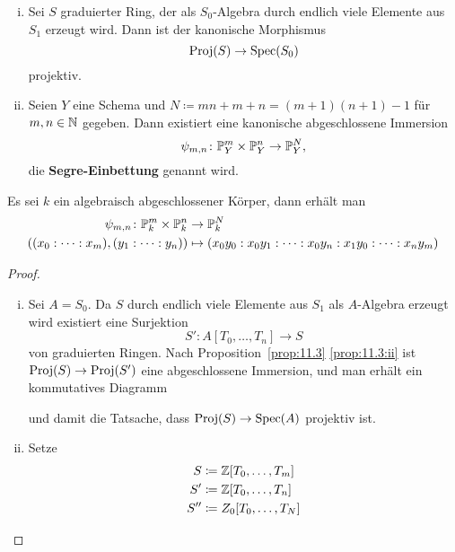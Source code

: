 \begin{kor}
	\label{kor:11.4}
	\begin{enumerate}[i)]
		\item\label{kor:11.4:i} Sei $S$ graduierter Ring, der als $S_0$-Algebra durch endlich viele Elemente aus $S_1$ erzeugt wird. Dann ist der kanonische Morphismus
			\[
				\Proj(S) \to \Spec(S_0)
			\]
			projektiv.
		\item\label{kor:11.4:ii} Seien $Y$ eine Schema und $N \coloneqq mn + m + n = (m+1)(n+1)-1$ für $m,n \in \N$ gegeben. Dann existiert eine kanonische abgeschlossene Immersion
			\[
				\psi_{m,n} \colon \P_Y^m \times \P_Y^n \to \P_Y^N,
			\]
			die \textbf{Segre-Einbettung} genannt wird.
	\end{enumerate}
	\begin{bsp*} Es sei $k$ ein algebraisch abgeschlossener Körper, dann erhält man
		\begin{align*}
			\psi_{m,n} \colon \P_k^m \times \P_k^n &\to \P_k^N \\
			((x_0 : \dotsm : x_m),(y_1:\dotsm:y_n)) &\mapsto (x_0 y_0 : x_0 y_1 : \dotsm : x_0 y_n: x_1 y_0 : \dotsm : x_n y_m)
		\end{align*}    
	\end{bsp*}
	\begin{proof}
		\begin{enumerate}[i)]
		\item Sei $A =S_0$. Da $S$ durch endlich viele Elemente aus $S_1$ als $A$-Algebra erzeugt wird existiert eine Surjektion
			\[
				S' \colon A[T_0,\dotsc,T_n] \to S
			\]
			von graduierten Ringen. Nach Proposition~\ref{prop:11.3} \ref{prop:11.3:ii} ist $\Proj(S) \to \Proj(S')$ eine abgeschlossene Immersion, und man erhält ein kommutatives Diagramm
			\begin{center}
			\end{center}
			und damit die Tatsache, dass $\Proj(S) \to \Spec(A)$ projektiv ist.
		\item
			Setze 
			\begin{align*}
				S &\coloneqq \Z[T_0,\dotsc,T_m]\\
				S' &\coloneqq \Z[T_0,\dotsc, T_n]\\
				S'' &\coloneqq Z_0 [ T_0,\dotsc,T_N ]\\

\end{align*}
\end{enumerate}
\end{proof}
\end{kor}
